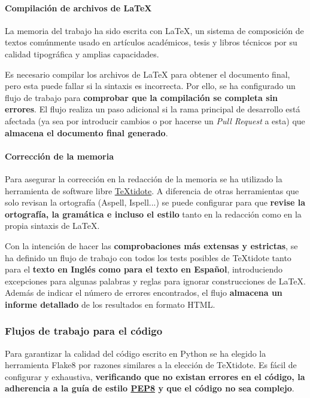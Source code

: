 \paragraph*{Compilación de archivos de LaTeX}
\hfill{}
\break
La memoria del trabajo ha sido escrita con LaTeX, un sistema de composición de textos comúnmente usado en artículos académicos, tesis y libros técnicos por su calidad tipográfica y amplias capacidades.

Es necesario compilar los archivos de LaTeX para obtener el documento final, pero esta puede fallar si la sintaxis es incorrecta. Por ello, se ha configurado un flujo de trabajo para \textbf{comprobar que la compilación se completa sin errores}. El flujo realiza un paso adicional si la rama principal de desarrollo está afectada (ya sea por introducir cambios o por hacerse un \textit{Pull Request} a esta) que \textbf{almacena el documento final generado}.

\paragraph*{Corrección de la memoria}
\hfill{}
\break
Para asegurar la corrección en la redacción de la memoria se ha utilizado la herramienta de software libre \href{https://github.com/sylvainhalle/textidote}{TeXtidote}. A diferencia de otras herramientas que solo revisan la ortografía (Aspell, Ispell...) se puede configurar para que \textbf{revise la ortografía, la gramática e incluso el estilo} tanto en la redacción como en la propia sintaxis de LaTeX.

Con la intención de hacer las \textbf{comprobaciones más extensas y estrictas}, se ha definido un flujo de trabajo con todos los tests posibles de TeXtidote tanto para el \textbf{texto en Inglés como para el texto en Español}, introduciendo excepciones para algunas palabras y reglas para ignorar construcciones de LaTeX. Además de indicar el número de errores encontrados, el flujo \textbf{almacena un informe detallado} de los resultados en formato HTML.


\subsubsection{Flujos de trabajo para el código}

Para garantizar la calidad del código escrito en Python se ha elegido la herramienta Flake8 por razones similares a la elección de TeXtidote. Es fácil de configurar y exhaustiva, \textbf{verificando que no existan errores en el código, la adherencia a la guía de estilo \href{https://peps.python.org/pep-0008/}{PEP8} y que el código no sea complejo}.

